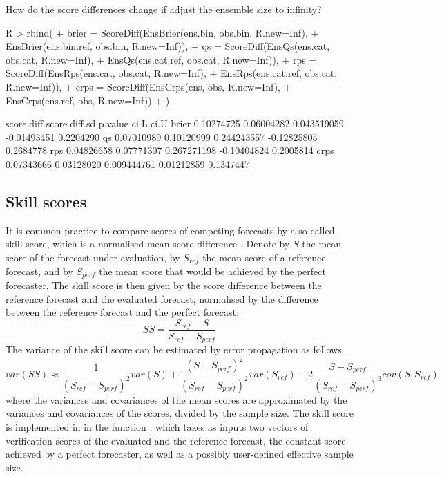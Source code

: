 \documentclass[article]{jss}
\begin{document}
How do the score differences change if adjust the ensemble size to infinity?

\begin{Schunk}
\begin{Sinput}
R > rbind(
+   brier = ScoreDiff(EnsBrier(ens.bin,     obs.bin, R.new=Inf), 
+                     EnsBrier(ens.bin.ref, obs.bin, R.new=Inf)),
+   qs    = ScoreDiff(EnsQs(ens.cat,     obs.cat, R.new=Inf), 
+                     EnsQs(ens.cat.ref, obs.cat, R.new=Inf)),
+   rps   = ScoreDiff(EnsRps(ens.cat,     obs.cat, R.new=Inf), 
+                     EnsRps(ens.cat.ref, obs.cat, R.new=Inf)),
+   crps  = ScoreDiff(EnsCrps(ens,     obs, R.new=Inf),  
+                     EnsCrps(ens.ref, obs, R.new=Inf))
+ )
\end{Sinput}
\begin{Soutput}
      score.diff score.diff.sd     p.value        ci.L      ci.U
brier 0.10274725    0.06004282 0.043519059 -0.01493451 0.2204290
qs    0.07010989    0.10120999 0.244243557 -0.12825805 0.2684778
rps   0.04826658    0.07771307 0.267271198 -0.10404824 0.2005814
crps  0.07343666    0.03128020 0.009444761  0.01212859 0.1347447
\end{Soutput}
\end{Schunk}


\subsection{Skill scores}

It is common practice to compare scores of competing forecasts by a so-called skill score, which is a normalised mean score difference \citep{wilks2011statistical}.
Denote by $S$ the mean score of the forecast under evaluation, by $S_{ref}$ the mean score of a reference forecast, and by $S_{perf}$ the mean score that would be achieved by the perfect forecaster.
The skill score is then given by the score difference between the reference forecast and the evaluated forecast, normalised by the difference between the reference forecast and the perfect forecast:
%
\begin{equation}
SS = \frac{S_{ref} - S}{S_{ref} - S_{perf}}
\end{equation}
%
The variance of the skill score can be estimated by error propagation as follows
%
\begin{equation}
var(SS) \approx \frac{1}{(S_{ref} - S_{perf})^2} var(S) + \frac{(S - S_{perf})^2}{(S_{ref}-S_{perf})^2} var(S_{ref}) - 2 \frac{S-S_{perf}}{(S_{ref}-S_{perf})^3} cov(S, S_{ref})
\end{equation}
%
where the variances and covariances of the mean scores are approximated by the variances and covariances of the scores, divided by the sample size.
The skill score is implemented in  in the function , which takes as inputs two vectors of verification scores of the evaluated and the reference forecast, the constant score achieved by a perfect forecaster, as well as a possibly user-defined effective sample size.
\end{document}

